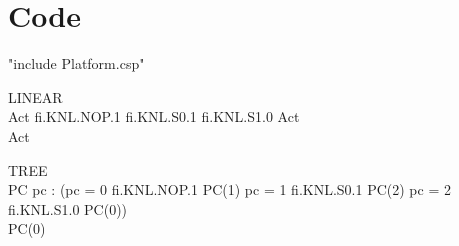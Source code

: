 \section{Code}

\begin{assert}
"include Platform.csp"
\end{assert}
\begin{circus}
\circprocess LINEAR \circdef \circbegin\\
  Act \circdef fi.KNL.NOP.1 \then
   fi.KNL.S0.1  \then
   fi.KNL.S1.0  \then Act\\
 \circspot Act\\
 \circend
\end{circus}
\begin{circus}
\circprocess TREE \circdef \circbegin\\
  PC \circdef pc : \nat \circspot
    (\lcircguard pc = 0 \rcircguard \circguard fi.KNL.NOP.1 \then PC(1)
     \extchoice
     \lcircguard pc = 1 \rcircguard \circguard fi.KNL.S0.1  \then PC(2)
     \extchoice
     \lcircguard pc = 2 \rcircguard \circguard fi.KNL.S1.0  \then PC(0))\\
  \circspot PC(0)\\
\circend

\end{circus}

